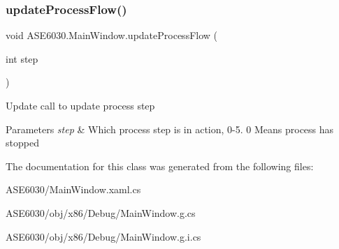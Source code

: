 \subsubsection{\texorpdfstring{update\+Process\+Flow()}{updateProcessFlow()}}
{\footnotesize\ttfamily void A\+S\+E6030.\+Main\+Window.\+update\+Process\+Flow (\begin{DoxyParamCaption}\item[{int}]{step }\end{DoxyParamCaption})\hspace{0.3cm}{\ttfamily [inline]}}



Update call to update process step 


\begin{DoxyParams}{Parameters}
{\em step} & Which process step is in action, 0-\/5. 0 Means process has stopped\\
\hline
\end{DoxyParams}


The documentation for this class was generated from the following files\+:\begin{DoxyCompactItemize}
\item 
A\+S\+E6030/Main\+Window.\+xaml.\+cs\item 
A\+S\+E6030/obj/x86/\+Debug/Main\+Window.\+g.\+cs\item 
A\+S\+E6030/obj/x86/\+Debug/Main\+Window.\+g.\+i.\+cs\end{DoxyCompactItemize}
